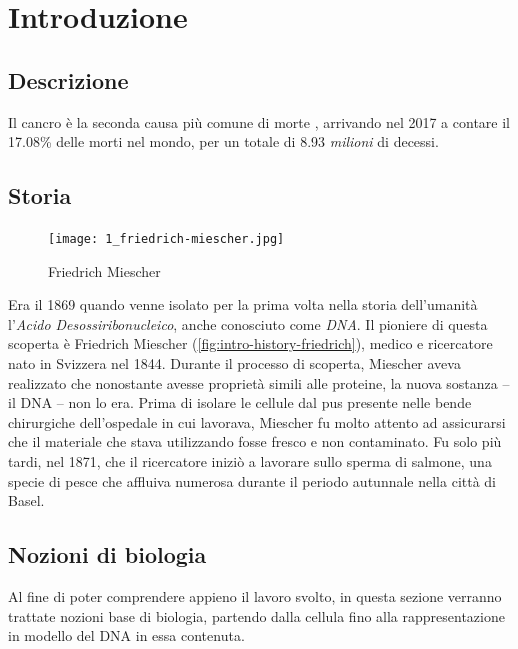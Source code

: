 
\chapter{Introduzione}
\label{chap:intro}


\section{Descrizione}
\label{chap:intro-description}
Il cancro è la seconda causa più comune di morte \cite{worldindatacancer}, arrivando nel 2017 a contare il 17.08\% delle morti nel mondo, per un totale di 8.93 \textit{milioni} di decessi.


\section{Storia}
\label{chap:intro-history}

\begin{figure}
    \centering
    \texttt{[image: 1\_friedrich-miescher.jpg]}
    \caption{Friedrich Miescher}
    \label{fig:intro-history-friedrich}
\end{figure}
Era il 1869 quando venne isolato per la prima volta nella storia dell'umanità l'\textit{Acido Desossiribonucleico}, anche conosciuto come \textit{DNA}. Il pioniere di questa scoperta è Friedrich Miescher (\autoref{fig:intro-history-friedrich}), medico e ricercatore nato in Svizzera nel 1844. Durante il processo di scoperta, Miescher aveva realizzato che nonostante  avesse proprietà simili alle proteine, la nuova sostanza -- il DNA -- non lo era. Prima di isolare le cellule dal pus presente nelle bende chirurgiche dell'ospedale in cui lavorava, Miescher fu molto attento ad assicurarsi che il materiale che stava utilizzando fosse fresco e non contaminato. Fu solo più tardi, nel 1871, che il ricercatore iniziò a lavorare sullo sperma di salmone, una specie di pesce che affluiva numerosa durante il periodo autunnale nella città di Basel.


\section{Nozioni di biologia}
\label{chap:intro-biology}
Al fine di poter comprendere appieno il lavoro svolto, in questa sezione verranno trattate nozioni base di biologia, partendo dalla cellula fino alla rappresentazione in modello del DNA in essa contenuta.

